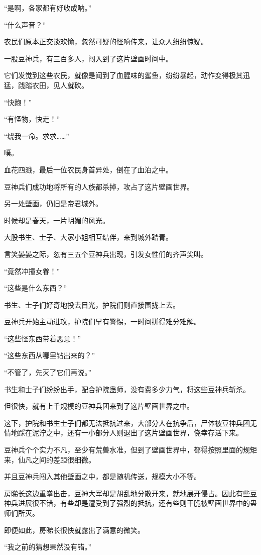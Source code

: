 \begin{this_body}
“是啊，各家都有好收成呐。”

“什么声音？”

农民们原本正交谈欢愉，忽然可疑的怪响传来，让众人纷纷惊疑。

一股豆神兵，有三百多人，闯入到了这片壁画时间中。

它们发觉到这些农民，就像是闻到了血腥味的鲨鱼，纷纷暴起，动作变得极其迅猛，践踏农田，见人就砍。

“快跑！”

“有怪物，快走！”

“绕我一命。求求……”

噗。

血花四溅，最后一位农民身首异处，倒在了血泊之中。

豆神兵们成功地将所有的人族都杀掉，攻占了这片壁画世界。

另一处壁画，仍旧是帝君城外。

时候却是春天，一片明媚的风光。

大股书生、士子、大家小姐相互结伴，来到城外踏青。

言笑晏晏之际，忽有三五个豆神兵出现，引发女性们的齐声尖叫。

“竟然冲撞女眷！”

“这些是什么东西？”

书生、士子们好奇地投去目光，护院们则直接围拢上去。

豆神兵开始主动进攻，护院们早有警惕，一时间拼得难分难解。

“这些怪东西带着恶意！”

“这些东西从哪里钻出来的？”

“不管了，先灭了它们再说。”

书生和士子们纷纷出手，配合护院蛊师，没有费多少力气，将这些豆神兵斩杀。

但很快，就有上千规模的豆神兵团来到了这片壁画世界之中。

这下，护院和书生士子们都无法抵抗过来，大部分人在抗争后，尸体被豆神兵团无情地踩在泥泞之中，还有一小部分人则退出了这片壁画世界，侥幸存活下来。

豆神兵个个实力不凡，至少有荒兽水准，但到了壁画世界中，都得按照里面的规矩来，仙凡之间的差距很细微。

并且豆神兵闯入其他壁画之中，都是随机传送，规模大小不等。

房睇长这边重拳出击，豆神大军却是胡乱地分散开来，就地展开侵占。因此有些豆神兵进展很不错，有些却是遭受到了强烈的抵抗，还有些则干脆被壁画世界中的蛊师们所灭。

即便如此，房睇长很快就露出了满意的微笑。

“我之前的猜想果然没有错。”


\end{this_body}
